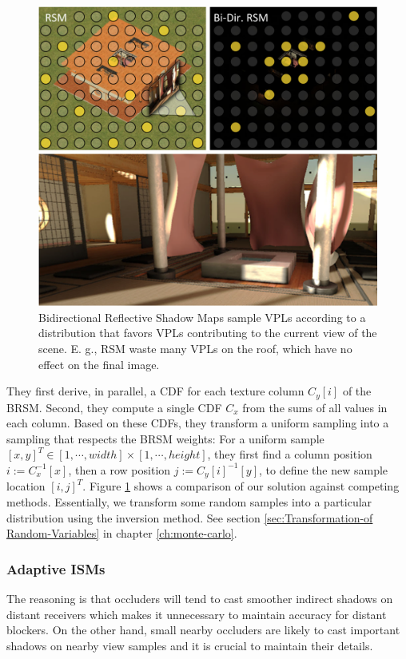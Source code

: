 \begin{figure}\label{f:adaptive-ISMs-2}
	\begin{center}
		\includegraphics[width=1.\textwidth]{graphics/ir/ir-5-2}
	\end{center}
	\caption{Bidirectional Reflective Shadow Maps sample VPLs according to a distribution that favors VPLs contributing to the current view of the scene. E. g., RSM waste many VPLs on the roof, which have no effect on the final image.}
\end{figure}

They first derive, in parallel, a CDF for each texture column $C_y[i]$ of the BRSM. Second, they compute a single CDF $C_x$ from the sums of all values in each column. Based on these CDFs, they transform a uniform sampling into a sampling that respects the BRSM weights: For a uniform sample $[x,y]^{T}\in[1,\cdots ,width]\times [1,\cdots ,height]$, they first find a column position $i:=C^{-1}_x[x]$, then a row position $j:=C_y[i]^{-1}[y]$, to define the new sample location $[i,j]^{T}$. Figure \ref{f:adaptive-ISMs-2} shows a comparison of our solution against competing methods. Essentially, we transform some random samples into a particular distribution using the inversion method. See section \ref{sec:Transformation-of Random-Variables} in chapter \ref{ch:monte-carlo}.



\subsubsection{Adaptive ISMs}
The reasoning is that occluders will tend to cast smoother indirect shadows on distant receivers which makes it unnecessary to maintain accuracy for distant blockers. On the other hand, small nearby occluders are likely to cast important shadows on nearby view samples and it is crucial to maintain their details.

